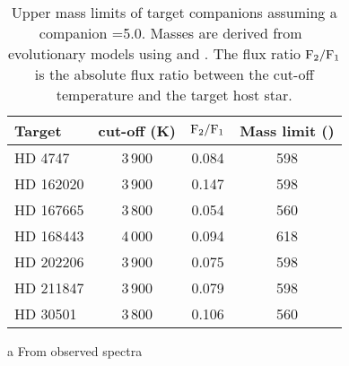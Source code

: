 \begin{table}
       \centering
  \begin{threeparttable}
       \caption[Upper mass limits from \textchisquared{} simulations.]{Upper mass limits of target companions assuming a companion \logg{}=5.0.
           Masses are derived from~\citet{baraffe_new_2015} evolutionary models using \Teff{} and \logg{}.
           The flux ratio \(\rm F_2/F_1\) is the absolute flux ratio between the cut-off temperature and the target host star.}

        \begin{tabular}{l c c c}
            \toprule
            Target & \Teff{} cut-off (K) & \(\rm F_2/F_1\) & Mass limit (\Mjup{})\\
            \midrule
            {HD 4747}     &  3\,900 & 0.084 & 598 \\
            {HD 162020} & 3\,900 & 0.147 & 598 \\
            {HD 167665} & 3\,800 & 0.054 & 560 \\
            {HD 168443} & 4\,000 & 0.094 & 618 \\
            {HD 202206} & 3\,900 & 0.075 & 598 \\
            {HD 211847} & 3\,900 & 0.079 & 598 \\
            {HD 30501}   & 3\,800\tnote{a} & 0.106 & 560 \\
            \bottomrule
        \end{tabular}
        \label{tab:mass_limits}
        \begin{tablenotes}[flushleft]
            \small
                \item [a] {From observed spectra }
        \end{tablenotes}
  \end{threeparttable}

\end{table}

